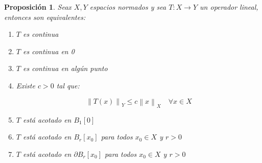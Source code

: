 \documentclass[11pt]{article}
\newcommand{\norm}[1]{\left\lVert#1\right\rVert}
\numberwithin{theorem}{subsection}
\newtheorem{proposition}[theorem]{Proposici\'on}
\begin{document}
\begin{proposition}
	\label{Continuidad de un operador}
	Seax $X,Y$ espacios normados y sea $T : X \rightarrow Y$ un operador lineal, entonces son equivalentes:
	
	\begin{enumerate}
		\item $T$ es continua
		\item $T$ es continua en 0
		\item $T$ es continua en alg\'un punto
		\item Existe $c > 0$ tal que:
		
		\begin{equation}
		\label{eq: Operador acotado}
		\norm{T(x)}_Y \leq c \norm{x}_X \quad \forall x \in X
		\end{equation}
		\item $T$ est\'a acotado en $B_1[0]$
		\item $T$ est\'a acotado en $B_r[x_0]$ para todos $x_0 \in X$ y $r > 0$
		\item $T$ est\'a acotado en $\partial B_r[x_0]$ para todos $x_0 \in X$ y $r > 0$
	\end{enumerate}
\end{proposition}
\end{document}

